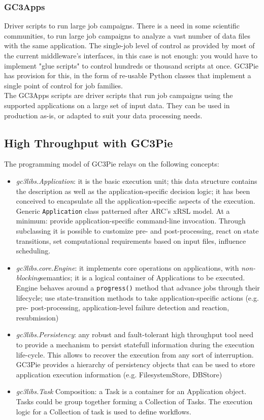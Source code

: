 \documentclass{PoS}
\begin{document}
\subsubsection*{GC3Apps}
Driver scripts to run large job campaigns. There is a need in some
scientific communities, to run large job
campaigns to analyze a vast number of data files with the same
application. The single-job level of control as provided by most of
the current middleware's interfaces, in this case is not
enough: you would have to implement "glue scripts" to control hundreds
or thousand scripts at once. GC3Pie has provision for this, in the
form of re-usable Python classes that implement a single point of
control for job families. \\

The GC3Apps scripts are driver scripts that run job campaigns using
the supported applications on a large set of input data. They can be
used in production as-is, or adapted to suit your data processing
needs. 

\subsection{High Throughput with GC3Pie}
The programming model of GC3Pie relays on the following concepts:
\begin{itemize}
\item \emph{gc3libs.Application}: it is the basic execution unit; this data
  structure contains the description as well as the
  application-specific decision logic; it has been conceived to
  encapsulate all the application-specific aspects of the
  execution. Generic \texttt{Application} class
  patterned after
  ARC's xRSL \cite{arc:xrsl}
  model. At a minimum: provide application-specific command-line
  invocation. Through subclassing it is possible to customize pre- and
  post-processing, react on state transitions, set computational
  requirements based on input files, influence scheduling.
\item \emph{gc3libs.core.Engine}: it implements core operations on
  applications, with \emph{non-blocking}semantics; it is a logical
  container of Applications to be executed.
  Engine behaves around a \texttt{progress()} method that advance jobs
  through their lifecycle; use state-transition methods to take
  application-specific actions (e.g. pre- post-processing,
  application-level failure detection and reaction, resubmission)
\item \emph{gc3libs.Persistency}: any robust and fault-tolerant high
  throughput tool need to provide a mechanism to persist statefull
  information during the execution life-cycle. This allows to recover
  the execution from any sort of interruption. GC3Pie provides a
  hierarchy of persistency objects that can be used to store
  application execution information (e.g. FilesystemStore, DBStore)
\item \emph{gc3libs.Task} Composition: a Task is a container for an
  Application object. Tasks could be group together forming a
  Collection of Tasks. The execution logic for a Collection of task is
  used to define workflows.
\end{itemize}
\end{document}

